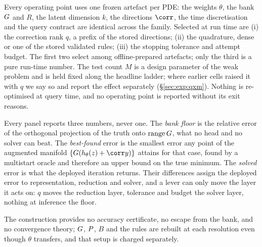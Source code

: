 Every operating point uses one frozen artefact per PDE: the weights $\theta$,
the bank $G$ and $R$, the latent dimension $k$, the directions $\corr$, the
time discretisation and the query contract are identical across the family.
Selected at run time are (i) the correction rank $q$, a prefix of the stored
directions; (ii) the quadrature, dense or one of the stored validated rules;
(iii) the stopping tolerance and attempt budget. The first two select among
offline-prepared artefacts; only the third is a pure run-time number. The test
count $M$ is a design parameter of the weak problem and is held fixed along the
headline ladder; where earlier cells raised it with $q$ we say so and report
the effect separately (\S\ref{sec:exp:qxm}). Nothing is re-optimised at query
time, and no operating point is reported without its exit reasons.

\label{sec:method:layers}
Every panel reports three numbers, never one. The \emph{bank floor} is the
relative error of the orthogonal projection of the truth onto
$\operatorname{range}G$, what no head and no solver can beat. The
\emph{best-found} error is the smallest error any point of the augmented
manifold $\{\bank(\head(\latent)+\corr y)\}$ attains for that case, found by a
multistart oracle and therefore an upper bound on the true minimum. The
\emph{solved} error is what the deployed iteration returns. Their differences
assign the deployed error to representation, reduction and solver, and a lever
can only move the layer it acts on: $q$ moves the reduction layer, tolerance
and budget the solver layer, nothing at inference the floor.

\label{sec:method:limits}
The construction provides no accuracy certificate, no escape from the bank, and
no convergence theory; $G$, $P$, $B$ and the rules are rebuilt at each
resolution even though $\theta$ transfers, and that setup is charged
separately.

